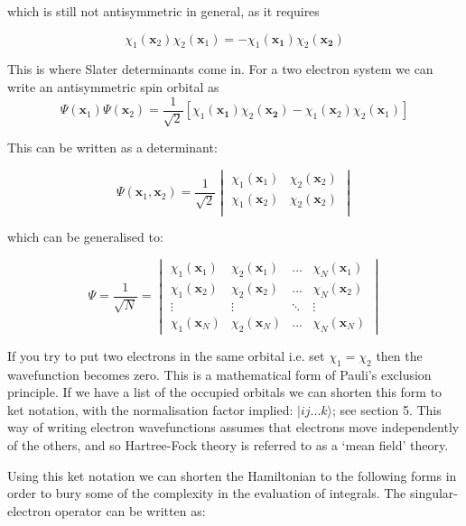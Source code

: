 \documentclass[10pt]{article}
\begin{document}
which is still not antisymmetric in general, as it requires

\begin{equation*}
	\chi_1(\mathbf{x}_2)\chi_2(\mathbf{x}_1) = -\chi_1(\mathbf{x_1})\chi_2(\mathbf{x_2})
\end{equation*}

This is where Slater determinants come in. For a two electron system we can write an antisymmetric spin orbital as $$\Psi(\mathbf{x}_1)\Psi(\mathbf{x}_2) = \frac{1}{\sqrt{2}}[\chi_1(\mathbf{x_1})\chi_2(\mathbf{x_2})-\chi_1(\mathbf{x}_2)\chi_2(\mathbf{x}_1)]$$

This can be written as a determinant:

\begin{equation*}
	\Psi(\mathbf{x}_1,\mathbf{x}_2) = \frac{1}{\sqrt{2}}
\begin{vmatrix}
	\chi_1(\mathbf{x}_1) & \chi_2(\mathbf{x}_2)\\
	\chi_1(\mathbf{x}_2) & \chi_2(\mathbf{x}_2) \\
	\end{vmatrix}
\end{equation*}

which can be generalised to:

\begin{equation}
	\Psi = \frac{1}{\sqrt{N}} =
	\begin{vmatrix}
	\chi_1(\mathbf{x}_1) & \chi_2(\mathbf{x}_1) & ... & \chi_N(\mathbf{x}_1) \\
	\chi_1(\mathbf{x}_2) & \chi_2(\mathbf{x}_2) & ... & \chi_N(\mathbf{x}_2) \\
	\vdots & \vdots &\ddots & \vdots \\
	\chi_1(\mathbf{x}_N) & \chi_2(\mathbf{x}_N) & ... & \chi_N(\mathbf{x}_N)
	\end{vmatrix}
\end{equation}

If you try to put two electrons in the same orbital i.e. set $\chi_1 = \chi_2$ then the wavefunction becomes zero. This is a mathematical form of Pauli's exclusion principle. If we have a list of the occupied orbitals we can shorten this form to ket notation, with the normalisation factor implied: $|ij...k\rangle$; see section 5. This way of writing electron wavefunctions assumes that electrons move independently of the others, and so Hartree-Fock theory is referred to as a `mean field' theory. 

Using this ket notation we can shorten the Hamiltonian to the following forms in order to bury some of the complexity in the evaluation of integrals. The singular-electron operator can be written as:
\end{document}
